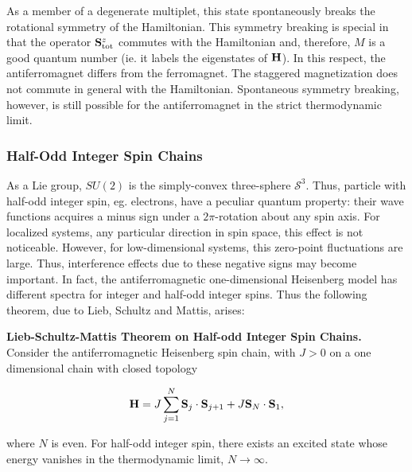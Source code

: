 \documentclass{homework}
\begin{document}
As a member of a degenerate multiplet, this state spontaneously breaks the rotational symmetry of the Hamiltonian. This symmetry breaking is special in that the operator ${\bf S}_{\textnormal{tot}}^z$ commutes with the Hamiltonian and, therefore, $M$ is a good quantum number (ie. it labels the eigenstates of ${\bf H}$). In this respect, the antiferromagnet differs from the ferromagnet. The staggered magnetization does not commute in general with the Hamiltonian. Spontaneous symmetry breaking, however, is still possible for the antiferromagnet in the strict thermodynamic limit. \\

\subsubsection{Half-Odd Integer Spin Chains}

As a Lie group, $SU(2)$ is the simply-convex three-sphere $\bm{\mathcal{S}}^3$. Thus, particle with half-odd integer spin, eg. electrons, have a peculiar quantum property: their wave functions acquires a minus sign under a $2\pi$-rotation about any spin axis. For localized systems, any particular direction in spin space, this effect is not noticeable. However, for low-dimensional systems, this zero-point fluctuations are large. Thus, interference effects due to these negative signs may become important. In fact, the antiferromagnetic one-dimensional Heisenberg model has different spectra for integer and half-odd integer spins. Thus the following theorem, due to Lieb, Schultz and Mattis, arises: \\


\begin{theorem} \textbf{{Lieb-Schultz-Mattis Theorem on Half-odd Integer Spin Chains.}} 
Consider the antiferromagnetic Heisenberg spin chain, with $J > 0$ on a one dimensional chain with closed topology 

\begin{equation}
    {\bf H} = J \sum_{j=1}^N {\bf S}_j \cdot {\bf S}_{j+1} + J {\bf S}_N \cdot {\bf S}_1,
\end{equation}

where $N$ is even. For half-odd integer spin, there exists an excited state whose energy vanishes in the thermodynamic limit, $N \rightarrow \infty$.
\end{theorem}
\end{document}
